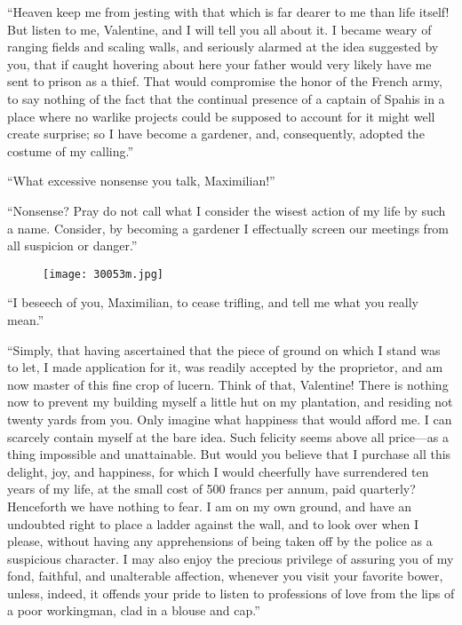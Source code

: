 “Heaven keep me from jesting with that which is far dearer to me than
life itself! But listen to me, Valentine, and I will tell you all about
it. I became weary of ranging fields and scaling walls, and seriously
alarmed at the idea suggested by you, that if caught hovering about
here your father would very likely have me sent to prison as a thief.
That would compromise the honor of the French army, to say nothing of
the fact that the continual presence of a captain of Spahis in a place
where no warlike projects could be supposed to account for it might
well create surprise; so I have become a gardener, and, consequently,
adopted the costume of my calling.”

“What excessive nonsense you talk, Maximilian!”

“Nonsense? Pray do not call what I consider the wisest action of my
life by such a name. Consider, by becoming a gardener I effectually
screen our meetings from all suspicion or danger.”

\begin{figure}[ht]
\texttt{[image: 30053m.jpg]}
\end{figure}

“I beseech of you, Maximilian, to cease trifling, and tell me what you
really mean.”

“Simply, that having ascertained that the piece of ground on which I
stand was to let, I made application for it, was readily accepted by
the proprietor, and am now master of this fine crop of lucern. Think of
that, Valentine! There is nothing now to prevent my building myself a
little hut on my plantation, and residing not twenty yards from you.
Only imagine what happiness that would afford me. I can scarcely
contain myself at the bare idea. Such felicity seems above all price—as
a thing impossible and unattainable. But would you believe that I
purchase all this delight, joy, and happiness, for which I would
cheerfully have surrendered ten years of my life, at the small cost of
500 francs per annum, paid quarterly? Henceforth we have nothing to
fear. I am on my own ground, and have an undoubted right to place a
ladder against the wall, and to look over when I please, without having
any apprehensions of being taken off by the police as a suspicious
character. I may also enjoy the precious privilege of assuring you of
my fond, faithful, and unalterable affection, whenever you visit your
favorite bower, unless, indeed, it offends your pride to listen to
professions of love from the lips of a poor workingman, clad in a
blouse and cap.”

